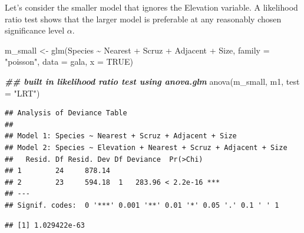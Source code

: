 \documentclass[
  ignorenonframetext,
]{beamer}
\newenvironment{Shaded}{\begin{snugshade}}{\end{snugshade}}
\newcommand{\AttributeTok}[1]{\textcolor[rgb]{0.77,0.63,0.00}{#1}}
\newcommand{\ConstantTok}[1]{\textcolor[rgb]{0.00,0.00,0.00}{#1}}
\newcommand{\DecValTok}[1]{\textcolor[rgb]{0.00,0.00,0.81}{#1}}
\newcommand{\DocumentationTok}[1]{\textcolor[rgb]{0.56,0.35,0.01}{\textbf{\textit{#1}}}}
\newcommand{\FunctionTok}[1]{\textcolor[rgb]{0.00,0.00,0.00}{#1}}
\newcommand{\NormalTok}[1]{#1}
\newcommand{\OtherTok}[1]{\textcolor[rgb]{0.56,0.35,0.01}{#1}}
\newcommand{\SpecialCharTok}[1]{\textcolor[rgb]{0.00,0.00,0.00}{#1}}
\newcommand{\StringTok}[1]{\textcolor[rgb]{0.31,0.60,0.02}{#1}}
\begin{document}
\begin{frame}[fragile]{}
\protect\hypertarget{section-13}{}
Let's consider the smaller model that ignores the Elevation variable. A
likelihood ratio test shows that the larger model is preferable at any
reasonably chosen significance level \(\alpha\).

\vspace{12pt}
\tiny

\begin{Shaded}
\begin{Highlighting}[]
\NormalTok{m\_small }\OtherTok{\textless{}{-}} \FunctionTok{glm}\NormalTok{(Species }\SpecialCharTok{\textasciitilde{}}\NormalTok{ Nearest }\SpecialCharTok{+}\NormalTok{ Scruz }\SpecialCharTok{+}\NormalTok{ Adjacent }\SpecialCharTok{+}\NormalTok{ Size, }
          \AttributeTok{family =} \StringTok{"poisson"}\NormalTok{, }\AttributeTok{data =}\NormalTok{ gala, }\AttributeTok{x =} \ConstantTok{TRUE}\NormalTok{)}

\DocumentationTok{\#\# built in likelihood ratio test using anova.glm}
\FunctionTok{anova}\NormalTok{(m\_small, m1, }\AttributeTok{test =} \StringTok{"LRT"}\NormalTok{)}
\end{Highlighting}
\end{Shaded}

\begin{verbatim}
## Analysis of Deviance Table
## 
## Model 1: Species ~ Nearest + Scruz + Adjacent + Size
## Model 2: Species ~ Elevation + Nearest + Scruz + Adjacent + Size
##   Resid. Df Resid. Dev Df Deviance  Pr(>Chi)    
## 1        24     878.14                          
## 2        23     594.18  1   283.96 < 2.2e-16 ***
## ---
## Signif. codes:  0 '***' 0.001 '**' 0.01 '*' 0.05 '.' 0.1 ' ' 1
\end{verbatim}

\begin{Shaded}
\end{Shaded}

\begin{verbatim}
## [1] 1.029422e-63
\end{verbatim}
\end{frame}
\end{document}
